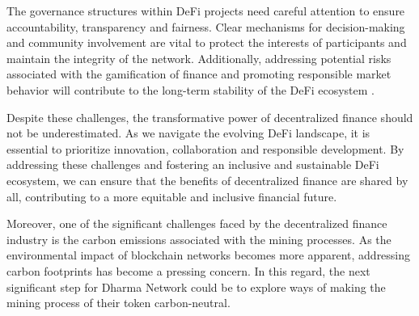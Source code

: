 The governance structures within DeFi projects need careful attention to ensure accountability, transparency and fairness. Clear mechanisms for decision-making and community involvement are vital to protect the interests of participants and maintain the integrity of the network. Additionally, addressing potential risks associated with the gamification of finance and promoting responsible market behavior will contribute to the long-term stability of the DeFi ecosystem \cite{oecd}.\newline

Despite these challenges, the transformative power of decentralized finance should not be underestimated. As we navigate the evolving DeFi landscape, it is essential to prioritize innovation, collaboration and responsible development. By addressing these challenges and fostering an inclusive and sustainable DeFi ecosystem, we can ensure that the benefits of decentralized finance are shared by all, contributing to a more equitable and inclusive financial future.\newline


\begin{comment}
    However, challenges remain. Technological barriers, regulatory frameworks and infrastructure limitations, such as poor or no access to the Internet, must be addressed to ensure widespread adoption and inclusivity. Moreover, efforts must be made to bridge the digital divide and provide education and awareness about DeFi to underserved communities. Collaboration between governments, financial institutions and technology innovators is crucial to harness the full potential of decentralized finance in tackling global income inequality.

Decentralized finance and cryptocurrencies have the potential to reshape the global financial landscape and address the persistent issue of income inequality. By providing accessible, transparent, and inclusive financial services, DeFi can empower individuals and communities that have been historically marginalized. While challenges exist, the transformative power of decentralized finance should not be underestimated. As we navigate this evolving landscape, it is essential to prioritize innovation, collaboration, and responsible development to ensure that the benefits of DeFi are shared by all.
\end{comment}

Moreover, one of the significant challenges faced by the decentralized finance industry is the carbon emissions associated with the mining processes. As the environmental impact of blockchain networks becomes more apparent, addressing carbon footprints has become a pressing concern. In this regard, the next significant step for Dharma Network could be to explore ways of making the mining process of their token carbon-neutral.\newline

